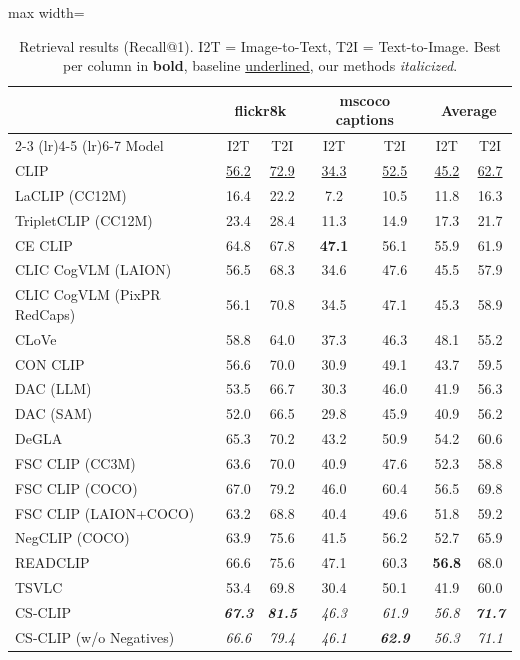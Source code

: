 \begin{table}[t]
  \centering
  \scriptsize
  \caption{Retrieval results (Recall@1). I2T = Image-to-Text, T2I = Text-to-Image. Best per column in \textbf{bold}, baseline \underline{underlined}, our methods \emph{italicized}.}
  \label{tab:retrieval_combined}
  \begin{adjustbox}{max width=\textwidth}
  \setlength{\tabcolsep}{3pt}
  \begin{tabular}{lcccccc}
    \toprule
     & \multicolumn{2}{c}{flickr8k} & \multicolumn{2}{c}{mscoco captions} & \multicolumn{2}{c}{Average} \\
    \cmidrule(lr){2-3} \cmidrule(lr){4-5} \cmidrule(lr){6-7}
    Model & I2T & T2I & I2T & T2I & I2T & T2I \\
    \midrule
    CLIP & \underline{56.2} & \underline{72.9} & \underline{34.3} & \underline{52.5} & \underline{45.2} & \underline{62.7} \\
    \midrule
    LaCLIP (CC12M) & 16.4 & 22.2 & 7.2 & 10.5 & 11.8 & 16.3 \\
    TripletCLIP (CC12M) & 23.4 & 28.4 & 11.3 & 14.9 & 17.3 & 21.7 \\
    \midrule
    CE CLIP & 64.8 & 67.8 & \textbf{47.1} & 56.1 & 55.9 & 61.9 \\
    CLIC CogVLM (LAION) & 56.5 & 68.3 & 34.6 & 47.6 & 45.5 & 57.9 \\
    CLIC CogVLM (PixPR RedCaps) & 56.1 & 70.8 & 34.5 & 47.1 & 45.3 & 58.9 \\
    CLoVe & 58.8 & 64.0 & 37.3 & 46.3 & 48.1 & 55.2 \\
    CON CLIP & 56.6 & 70.0 & 30.9 & 49.1 & 43.7 & 59.5 \\
    DAC (LLM) & 53.5 & 66.7 & 30.3 & 46.0 & 41.9 & 56.3 \\
    DAC (SAM) & 52.0 & 66.5 & 29.8 & 45.9 & 40.9 & 56.2 \\
    DeGLA & 65.3 & 70.2 & 43.2 & 50.9 & 54.2 & 60.6 \\
    FSC CLIP (CC3M) & 63.6 & 70.0 & 40.9 & 47.6 & 52.3 & 58.8 \\
    FSC CLIP (COCO) & 67.0 & 79.2 & 46.0 & 60.4 & 56.5 & 69.8 \\
    FSC CLIP (LAION+COCO) & 63.2 & 68.8 & 40.4 & 49.6 & 51.8 & 59.2 \\
    NegCLIP (COCO) & 63.9 & 75.6 & 41.5 & 56.2 & 52.7 & 65.9 \\
    READCLIP & 66.6 & 75.6 & 47.1 & 60.3 & \textbf{56.8} & 68.0 \\
    TSVLC & 53.4 & 69.8 & 30.4 & 50.1 & 41.9 & 60.0 \\
    \midrule
    CS-CLIP & \emph{\textbf{67.3}} & \emph{\textbf{81.5}} & \emph{46.3} & \emph{61.9} & \emph{56.8} & \emph{\textbf{71.7}} \\
    CS-CLIP (w/o Negatives) & \emph{66.6} & \emph{79.4} & \emph{46.1} & \emph{\textbf{62.9}} & \emph{56.3} & \emph{71.1} \\
    \bottomrule
  \end{tabular}
  \end{adjustbox}
\end{table}